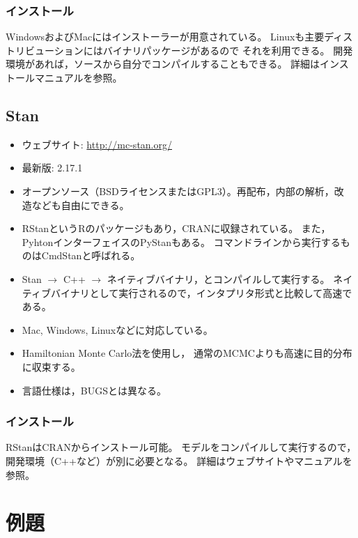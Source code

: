 \documentclass[11pt,uplatex]{jsarticle}
\begin{document}
\subsubsection*{インストール}
WindowsおよびMacにはインストーラーが用意されている。
Linuxも主要ディストリビューションにはバイナリパッケージがあるので
それを利用できる。
開発環境があれば，ソースから自分でコンパイルすることもできる。
詳細はインストールマニュアルを参照。

\subsection{Stan}
\label{Stan}
\begin{itemize}

\item ウェブサイト:
  \url{http://mc-stan.org/}

\item 最新版: 2.17.1
\item オープンソース（BSDライセンスまたはGPL3）。再配布，内部の解析，改
  造なども自由にできる。
\item \textsf{RStan}という\textsf{R}のパッケージもあり，CRANに収録されている。
また，Pyhtonインターフェイスの\textsf{PyStan}もある。
コマンドラインから実行するものは\textsf{CmdStan}と呼ばれる。
\item Stan $\rightarrow$ C++ $\rightarrow$ ネイティブバイナリ，とコンパイルして実行する。
ネイティブバイナリとして実行されるので，インタプリタ形式と比較して高速である。
\item Mac, Windows, Linuxなどに対応している。
\item Hamiltonian Monte Carlo法\cite{PRML, BDA3, Toyoda2015}を使用し，
通常のMCMCよりも高速に目的分布に収束する。
\item 言語仕様は，BUGSとは異なる。
\end{itemize}

\subsubsection*{インストール}
RStanはCRANからインストール可能。
モデルをコンパイルして実行するので，開発環境（C++など）が別に必要となる。
詳細はウェブサイトやマニュアルを参照。



\section{例題}
\end{document}
